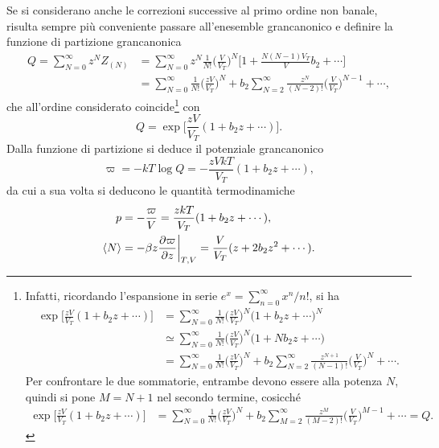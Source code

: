 Se si considerano anche le correzioni successive al primo ordine non banale, risulta sempre più conveniente passare all'enesemble grancanonico e definire la funzione di partizione grancanonica
\begin{equation}
    \begin{split}
        Q = \sum_{N=0}^\infty z^NZ_{(N)} &= \sum_{N=0}^\infty z^N\frac{1}{N!}\bigg(\frac{V}{V_T}\bigg)^N\bigg[1 + \frac{N(N-1)V_T}{V}b_2 + \cdots\bigg] \\
        &= \sum_{N=0}^\infty \frac{1}{N!}\bigg(\frac{zV}{V_T}\bigg)^N  + b_2\sum_{N=2}^\infty \frac{z^N}{(N-2)!}\bigg(\frac{V}{V_T}\bigg)^{N-1} + \cdots,
    \end{split}
\end{equation}
che all'ordine considerato coincide\footnote{Infatti, ricordando l'espansione in serie $e^x = \sum_{n=0}^\infty x^n/n!$, si ha
\begin{align}
        \exp{\bigg[\frac{zV}{V_T}(1 + b_2z + \cdots)\bigg]} &= \sum_{N=0}^{\infty} \frac{1}{N!} \bigg(\frac{zV}{V_T}\bigg)^N
        \bigg(1 + b_2 z + \cdots \bigg)^N \\
        &\simeq \sum_{N=0}^{\infty} \frac{1}{N!}
        \bigg(\frac{zV}{V_T}\bigg)^N
        \bigg(1 + N b_2 z + \cdots \bigg) \\
        &= \sum_{N=0}^{\infty} \frac{1}{N!} \bigg(\frac{zV}{V_T}\bigg)^N + b_2 \sum_{N=2}^{\infty}\frac{z^{N+1}}{(N-1)!} \bigg(\frac{V}{V_T}\bigg)^N + \cdots.
\end{align}
Per confrontare le due sommatorie, entrambe devono essere alla potenza $N$,
quindi si pone $M = N + 1$ nel secondo termine, cosicché 
\begin{align}
    \exp{\bigg[\frac{zV}{V_T}(1 + b_2z + \cdots)\bigg]} &= \sum_{N=0}^{\infty} \frac{1}{N!} \bigg(\frac{zV}{V_T}\bigg)^N + b_2 \sum_{M=2}^{\infty} \frac{z^M}{(M-2)!} \bigg(\frac{V}{V_T}\bigg)^{M-1} + \cdots = Q.
\end{align}} con
\begin{equation}
    Q = \exp{\bigg[\frac{zV}{V_T}(1 + b_2z + \cdots)\bigg]}.
\end{equation}
Dalla funzione di partizione si deduce il potenziale grancanonico 
\begin{equation}
    \varpi = -kT\log{Q} = -\frac{zVkT}{V_T}(1 + b_2z + \cdots),
\end{equation}
da cui a sua volta si deducono le quantità termodinamiche
\begin{align}
\label{eq: pressione e N medio gas interagente (grancanonico)}
    p &= -\frac{\varpi}{V} = \frac{zkT}{V_T}(1 + b_2z + \cdots), \\
    \langle N \rangle &= -\beta z\frac{\partial\varpi}{\partial z}\bigg|_{T,V} = \frac{V}{V_T}(z + 2b_2z^2 + \cdots).
\end{align}
